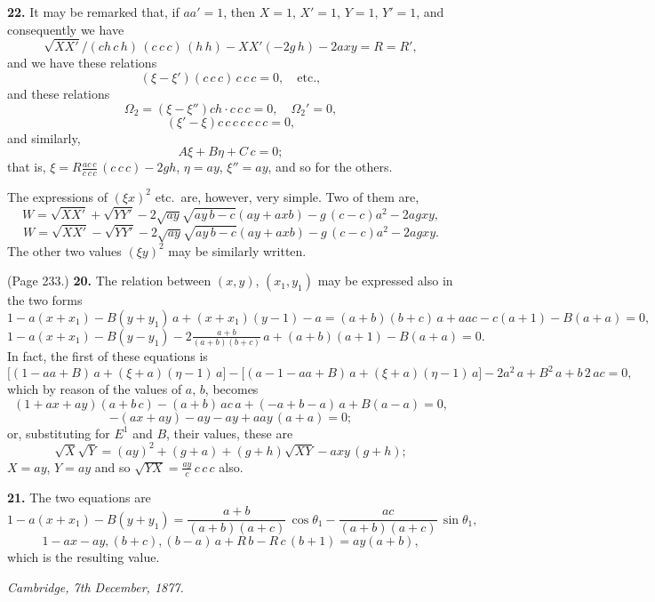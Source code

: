 \documentclass[11pt,a4paper]{article}
\theoremstyle{plain}
\theoremstyle{definition}
\begin{document}
\medskip

\noindent\textbf{22.} It may be remarked that, if $a a' = 1$, then $X = 1$, $X' = 1$, $Y = 1$, $Y' = 1$, and consequently we have
\[
\sqrt{X X'}/(c h\,c\,h)\,(c\,c\,c)\,(h\,h) - X X' (- 2 g\,h) - 2 a x y = R = R',
\]
and we have these relations
\[
(\xi - \xi')(c\,c\,c)\,c\,c\,c = 0, \quad \text{etc.},
\]
and these relations
\[
\Omega_2 = (\xi - \xi'') c h \cdot c\,c\,c = 0, \quad \Omega_2' = 0,
\]
\[
(\xi' - \xi) c\,c\,c\,c\,c\,c\,c = 0,
\]
and similarly,
\[
A\xi + B \eta + C\,c = 0;
\]
that is, $\xi = R \frac{a c\,c}{c\,c\,c}\,(c\,c\,c) - 2 g h$, $\eta = a y$, $\xi'' = a y$, and so for the others.

The expressions of $(\xi x)^2$ etc.\ are, however, very simple. Two of them are,
\[
W = \sqrt{X X'} + \sqrt{Y Y'} - 2 \sqrt{a y}\sqrt{a y\,b - c} (a y + a x b) - g\,(c - c) a^2 - 2 a g x y,
\]
\[
W = \sqrt{X X'} - \sqrt{Y Y'} - 2 \sqrt{a y}\sqrt{a y\,b - c} (a y + a x b) - g\,(c - c) a^2 - 2 a g x y.
\]
The other two values $(\xi y)^2$ may be similarly written.

\medskip

\noindent (Page 233.) \textbf{20.} The relation between $(x, y)$, $(x_1, y_1)$ may be expressed also in the two forms
\[
1 - a (x + x_1) - B (y + y_1)\, a + (x + x_1)(y - 1) - a = (a + b)(b + c)\,a + a a c - c (a + 1) - B(a + a) = 0,
\]
\[
1 - a (x + x_1) - B (y - y_1) - 2 \tfrac{a + b}{(a + b)(b + c)}\,a + (a + b)(a + 1) - B (a + a) = 0.
\]
In fact, the first of these equations is
\[
\big[(1 - aa + B)\,a + (\xi + a)(\eta - 1)\,a\big] - \big[(a - 1 - a a + B)\,a + (\xi + a)(\eta - 1)\,a\big] - 2 a^2\,a + B^2\,a + b\,2\,a c = 0,
\]
which by reason of the values of $a$, $b$, becomes
\[
(1 + a x + a y)(a + b\,c) - (a + b)\,a c\,a + (- a + b - a)\,a + B (a - a) = 0,
\]
\[
- (a x + a y) - a y - a y + a a y\,(a + a) = 0;
\]
or, substituting for $E^1$ and $B$, their values, these are
\[
\sqrt{X}\sqrt{Y} = (a y)^2 + (g + a) + (g + h)\sqrt{X Y} - a x y\,(g + h);
\]
$X = a y$, $Y = a y$ and so $\sqrt{Y X} = \tfrac{a y}{c}\,c\,c\,c$ also.

\medskip

\noindent\textbf{21.} The two equations are
\[
1 - a(x + x_1) - B (y + y_1) = \frac{a + b}{(a + b)(a + c)}\,\cos\theta_1 - \frac{a c}{(a + b)(a + c)}\,\sin\theta_1,
\]
\[
1 - a x - a y, (b + c), (b - a)\,a + R\,b - R\,c\,(b + 1) = a y(a + b),
\]
which is the resulting value.

\medskip

\noindent\textit{Cambridge, 7th December, 1877.}
\end{document}
